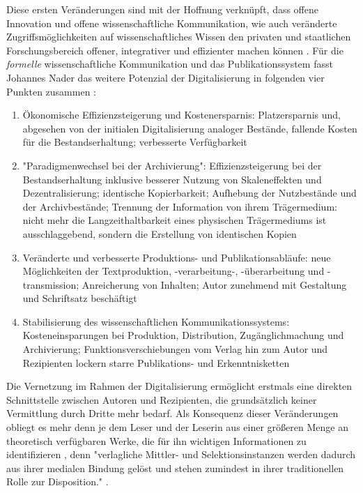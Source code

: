 Diese ersten Veränderungen sind mit der Hoffnung verknüpft, dass offene Innovation und offene wissenschaftliche Kommunikation, wie auch veränderte Zugriffsmöglichkeiten auf wissenschaftliches Wissen \cite[:109]{naeder_2010_open} den privaten und staatlichen Forschungsbereich offener, integrativer und effizienter machen können \cite{harmon_2012_commercialization}. Für die \textit{formelle} wissenschaftliche Kommunikation und das Publikationssystem fasst Johannes Nader das weitere Potenzial der Digitalisierung in folgenden vier Punkten zusammen \cite[:66-76]{naeder_2010_open}:
\begin{enumerate}
\item Ökonomische Effizienzsteigerung und Kostenersparnis: Platzersparnis und, abgesehen von der initialen Digitalisierung analoger Bestände, fallende Kosten für die Bestandserhaltung; verbesserte Verfügbarkeit
\item "Paradigmenwechsel bei der Archivierung": Effizienzsteigerung bei der Bestandserhaltung inklusive besserer Nutzung von Skaleneffekten und Dezentralisierung; identische Kopierbarkeit; Aufhebung der Nutzbestände und der Archivbestände; Trennung der Information von ihrem Trägermedium: nicht mehr die Langzeithaltbarkeit eines physischen Trägermediums ist ausschlaggebend, sondern die Erstellung von identischen Kopien
\item Veränderte und verbesserte Produktions- und Publikationsabläufe: neue Möglichkeiten der Textproduktion, -verarbeitung-, -überarbeitung und -transmission; Anreicherung von Inhalten; Autor zunehmend mit Gestaltung und Schriftsatz beschäftigt
\item Stabilisierung des wissenschaftlichen Kommunikationssystems: Kosteneinsparungen bei Produktion, Distribution, Zugänglichmachung und Archivierung; Funktionsverschiebungen vom Verlag hin zum Autor und Rezipienten lockern starre Publikations- und Erkenntnisketten
\end{enumerate}

Die Vernetzung im Rahmen der Digitalisierung ermöglicht erstmals eine direkten Schnittstelle zwischen Autoren und Rezipienten, die grundsätzlich keiner Vermittlung durch Dritte mehr bedarf. Als Konsequenz dieser Veränderungen obliegt es mehr denn je dem Leser und der Leserin aus einer größeren Menge an theoretisch verfügbaren Werke, die für ihn wichtigen Informationen zu identifizieren \cite{hagner_2015_sache_buches}, denn "verlagliche Mittler- und Selektionsinstanzen werden dadurch aus ihrer medialen Bindung gelöst und stehen zumindest in ihrer traditionellen Rolle zur Disposition." \cite[:109]{naeder_2010_open}.

